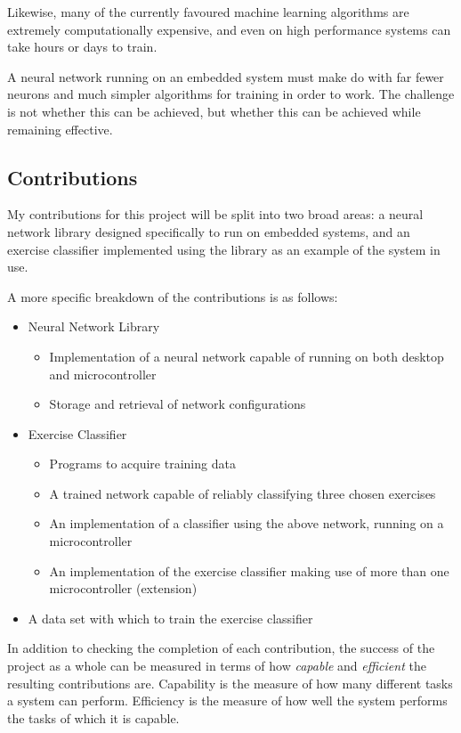 \documentclass[a4paper]{article}
\begin{document}
Likewise, many of the currently favoured machine learning algorithms are extremely computationally expensive, and even on high performance systems can take hours or days to train.

A neural network running on an embedded system must make do with far fewer neurons and much simpler algorithms for training in order to work. The challenge is not whether this can be achieved, but whether this can be achieved while remaining effective.

\subsection{Contributions}%
\label{subsec:in_cs}

My contributions for this project will be split into two broad areas: a neural network library designed specifically to run on embedded systems, and an exercise classifier implemented using the library as an example of the system in use.

A more specific breakdown of the contributions is as follows:

\begin{itemize}
\item Neural Network Library 
  \begin{itemize}
  \item Implementation of a neural network capable of running on  both desktop and microcontroller
    \item Storage and retrieval of network configurations
  \end{itemize}
\item Exercise Classifier
  \begin{itemize}
  \item Programs to acquire training data
    \item A trained network capable of reliably classifying three chosen exercises
    \item An implementation of a classifier using the above network, running on a microcontroller
    \item An implementation of the exercise classifier making use of more than one microcontroller (extension)
  \end{itemize}
\item A data set with which to train the exercise classifier
\end{itemize}

In addition to checking the completion of each contribution, the success of the project as a whole can be measured in terms of how \textit{capable} and \textit{efficient} the resulting contributions are. Capability is the measure of how many different tasks a system can perform.
Efficiency is the measure of how well the system performs the tasks of which it is capable. 
\end{document}
